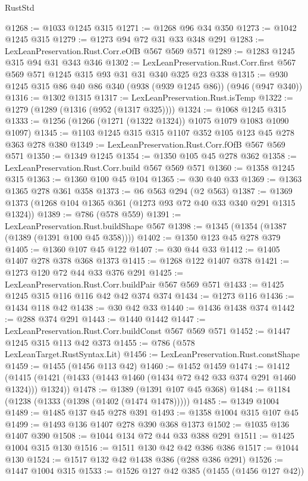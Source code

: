 \begin{lexlean}{RustStd}
\begin{coremodule}
@1268 := @1033 @1245 @315
@1271 := @1268 @96 @34 @350
@1273 := @1042 @1245 @315
@1279 := @1273 @94 @72 @31 @33 @348 @291
@1283 := LexLeanPreservation.Rust.Corr.eOfB @567 @569 @571
@1289 := @1283 @1245 @315 @94 @31 @343 @346
@1302 := LexLeanPreservation.Rust.Corr.first
    @567
    @569
    @571
    @1245
    @315
    @93
    @31
    @31
    @340
    @325
    @23
    @338
@1315 := @930 @1245 @315 @86 @40 @86 @340 (@938 (@939 @1245 @86)) (@946 (@947 @340))
@1316 := @1302 @1315
@1317 := LexLeanPreservation.Rust.isTemp
@1322 := @1279 (@1289 (@1316 (@952 (@1317 @325))))
@1324 := @1068 @1245 @315
@1333 := @1256 (@1266 (@1271 (@1322 @1324)) @1075 @1079 @1083 @1090 @1097)
@1345 := @1103 @1245 @315 @315 @1107 @352 @105 @123 @45 @278 @363 @278 @380
@1349 := LexLeanPreservation.Rust.Corr.fOfB @567 @569 @571
@1350 := @1349 @1245
@1354 := @1350 @105 @45 @278 @362
@1358 := LexLeanPreservation.Rust.Corr.build @567 @569 @571
@1360 := @1358 @1245 @315
@1363 := @1360 @100 @45 @104
@1365 := @30 @40 @33
@1369 := @1363 @1365 @278 @361 @358
@1373 := @6 @563 @294 (@2 @563)
@1387 := @1369 @1373 (@1268 @104 @1365 @361 (@1273 @93 @72 @40 @33 @340 @291 @1315 @1324))
@1389 := @786 (@578 @559)
@1391 := LexLeanPreservation.Rust.buildShape @567
@1398 := @1345 (@1354 (@1387 (@1389 (@1391 @100 @45 @358))))
@1402 := @1350 @123 @45 @278 @379
@1405 := @1360 @107 @45 @122
@1407 := @30 @44 @33
@1412 := @1405 @1407 @278 @378 @368 @1373
@1415 := @1268 @122 @1407 @378
@1421 := @1273 @120 @72 @44 @33 @376 @291
@1425 := LexLeanPreservation.Rust.Corr.buildPair @567 @569 @571
@1433 := @1425 @1245 @315 @116 @116 @42 @42 @374 @374
@1434 := @1273 @116
@1436 := @1434 @118 @42
@1438 := @30 @42 @33
@1440 := @1436 @1438 @374
@1442 := @288 @374 @291
@1443 := @1440 @1442
@1447 := LexLeanPreservation.Rust.Corr.buildConst @567 @569 @571
@1452 := @1447 @1245 @315 @113 @42 @373
@1455 := @786 (@578 LexLeanTarget.RustSyntax.Lit)
@1456 := LexLeanPreservation.Rust.constShape
@1459 := @1455 (@1456 @113 @42)
@1460 := @1452 @1459
@1474 := @1412 (@1415 (@1421 (@1433 (@1443 @1460 (@1434 @72 @42 @33 @374 @291 @1460 @1324))) @1324))
@1478 := @1389 (@1391 @107 @45 @368)
@1484 := @1184 (@1238 (@1333 (@1398 (@1402 (@1474 @1478)))))
@1485 := @1349 @1004
@1489 := @1485 @137 @45 @278 @391
@1493 := @1358 @1004 @315 @107 @45
@1499 := @1493 @136 @1407 @278 @390 @368 @1373
@1502 := @1035 @136 @1407 @390
@1508 := @1044 @134 @72 @44 @33 @388 @291
@1511 := @1425 @1004 @315 @130
@1516 := @1511 @130 @42 @42 @386 @386
@1517 := @1044 @130
@1524 := @1517 @132 @42 @1438 @386 (@288 @386 @291)
@1526 := @1447 @1004 @315
@1533 := @1526 @127 @42 @385 (@1455 (@1456 @127 @42))

\end{coremodule}
\end{lexlean}
